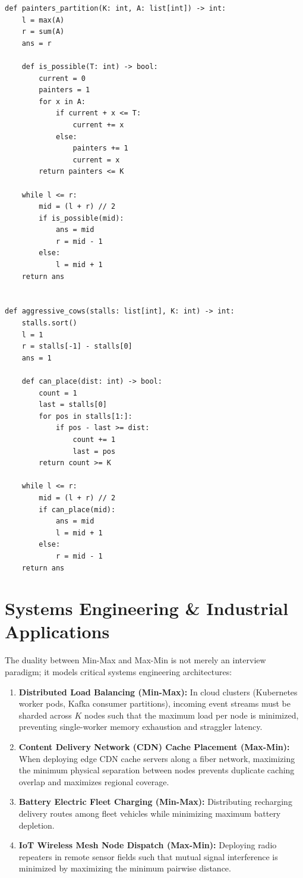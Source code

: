 \documentclass[10pt,journal,compsoc,onecolumn]{IEEEtran}
\begin{document}
{\footnotesize
\begin{verbatim}
def painters_partition(K: int, A: list[int]) -> int:
    l = max(A)
    r = sum(A)
    ans = r

    def is_possible(T: int) -> bool:
        current = 0
        painters = 1
        for x in A:
            if current + x <= T:
                current += x
            else:
                painters += 1
                current = x
        return painters <= K

    while l <= r:
        mid = (l + r) // 2
        if is_possible(mid):
            ans = mid
            r = mid - 1
        else:
            l = mid + 1
    return ans


def aggressive_cows(stalls: list[int], K: int) -> int:
    stalls.sort()
    l = 1
    r = stalls[-1] - stalls[0]
    ans = 1

    def can_place(dist: int) -> bool:
        count = 1
        last = stalls[0]
        for pos in stalls[1:]:
            if pos - last >= dist:
                count += 1
                last = pos
        return count >= K

    while l <= r:
        mid = (l + r) // 2
        if can_place(mid):
            ans = mid
            l = mid + 1
        else:
            r = mid - 1
    return ans
\end{verbatim}
}

\section{Systems Engineering \& Industrial Applications}
\label{sec:systems}

The duality between Min-Max and Max-Min is not merely an interview paradigm; it models critical systems engineering architectures:

\begin{enumerate}
    \item \textbf{Distributed Load Balancing (Min-Max):} In cloud clusters (Kubernetes worker pods, Kafka consumer partitions), incoming event streams must be sharded across $K$ nodes such that the maximum load per node is minimized, preventing single-worker memory exhaustion and straggler latency.
    \item \textbf{Content Delivery Network (CDN) Cache Placement (Max-Min):} When deploying edge CDN cache servers along a fiber network, maximizing the minimum physical separation between nodes prevents duplicate caching overlap and maximizes regional coverage.
    \item \textbf{Battery Electric Fleet Charging (Min-Max):} Distributing recharging delivery routes among fleet vehicles while minimizing maximum battery depletion.
    \item \textbf{IoT Wireless Mesh Node Dispatch (Max-Min):} Deploying radio repeaters in remote sensor fields such that mutual signal interference is minimized by maximizing the minimum pairwise distance.
\end{enumerate}
\end{document}
